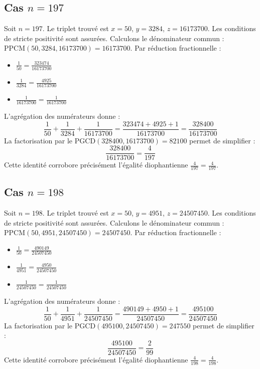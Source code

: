 \documentclass[11pt,a4paper]{article}
\begin{document}
\subsection{Cas $n = 197$}
Soit $n = 197$. Le triplet trouvé est $x = 50$, $y = 3284$, $z = 16173700$.
Les conditions de stricte positivité sont assurées.
Calculons le dénominateur commun : $\text{PPCM}(50, 3284, 16173700) = 16173700$.
Par réduction fractionnelle :
\begin{itemize}
    \item $\frac{1}{50} = \frac{323474}{16173700}$
    \item $\frac{1}{3284} = \frac{4925}{16173700}$
    \item $\frac{1}{16173700} = \frac{1}{16173700}$
\end{itemize}
L'agrégation des numérateurs donne :
$$ \frac{1}{50} + \frac{1}{3284} + \frac{1}{16173700} = \frac{323474 + 4925 + 1}{16173700} = \frac{328400}{16173700} $$
La factorisation par le $\text{PGCD}(328400, 16173700) = 82100$ permet de simplifier :
$$ \frac{328400}{16173700} = \frac{4}{197} $$
Cette identité corrobore précisément l'égalité diophantienne $\frac{4}{197} = \frac{4}{197}$.

\subsection{Cas $n = 198$}
Soit $n = 198$. Le triplet trouvé est $x = 50$, $y = 4951$, $z = 24507450$.
Les conditions de stricte positivité sont assurées.
Calculons le dénominateur commun : $\text{PPCM}(50, 4951, 24507450) = 24507450$.
Par réduction fractionnelle :
\begin{itemize}
    \item $\frac{1}{50} = \frac{490149}{24507450}$
    \item $\frac{1}{4951} = \frac{4950}{24507450}$
    \item $\frac{1}{24507450} = \frac{1}{24507450}$
\end{itemize}
L'agrégation des numérateurs donne :
$$ \frac{1}{50} + \frac{1}{4951} + \frac{1}{24507450} = \frac{490149 + 4950 + 1}{24507450} = \frac{495100}{24507450} $$
La factorisation par le $\text{PGCD}(495100, 24507450) = 247550$ permet de simplifier :
$$ \frac{495100}{24507450} = \frac{2}{99} $$
Cette identité corrobore précisément l'égalité diophantienne $\frac{4}{198} = \frac{4}{198}$.
\end{document}
